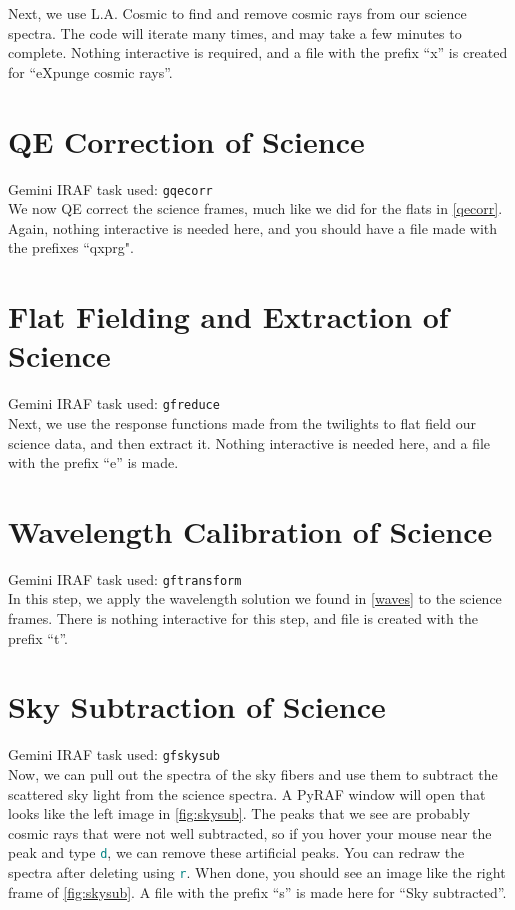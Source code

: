 \documentclass[12pt]{report}
\newcommand{\ty}[1]{\textcolor{teal}{\texttt{#1}}}
\begin{document}
\noindent Next, we use L.A. Cosmic to find and remove cosmic rays from our science spectra. The code will iterate many times, and may take a few minutes to complete. Nothing interactive is required, and a file with the prefix ``x'' is created for ``eXpunge cosmic rays''.

\bigskip
\section{QE Correction of Science}

\noindent Gemini IRAF task used: \texttt{gqecorr}\\

\noindent We now QE correct the science frames, much like we did for the flats in \autoref{qecorr}. Again, nothing interactive is needed here, and you should have a file made with the prefixes ``qxprg".

\bigskip
\section{Flat Fielding and Extraction of Science}

\noindent Gemini IRAF task used: \texttt{gfreduce}\\

\noindent Next, we use the response functions made from the twilights to flat field our science data, and then extract it. Nothing interactive is needed here, and a file with the prefix ``e'' is made.

\bigskip
\section{Wavelength Calibration of Science}

\noindent Gemini IRAF task used: \texttt{gftransform}\\

\noindent In this step, we apply the wavelength solution we found in \autoref{waves} to the science frames. There is nothing interactive for this step, and file is created with the prefix ``t''.

\bigskip
\section{Sky Subtraction of Science}

\noindent Gemini IRAF task used: \texttt{gfskysub}\\

\noindent Now, we can pull out the spectra of the sky fibers and use them to subtract the scattered sky light from the science spectra. A PyRAF window will open that looks like the left image in \autoref{fig:skysub}. The peaks that we see are probably cosmic rays that were not well subtracted, so if you hover your mouse near the peak and type \ty{d}, we can remove these artificial peaks. You can redraw the spectra after deleting using \ty{r}. When done, you should see an image like the right frame of \autoref{fig:skysub}. A file with the prefix ``s'' is made here for ``Sky subtracted''.
\end{document}
